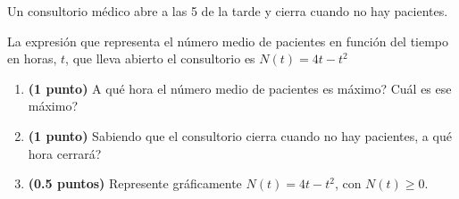
Un consultorio médico abre a las 5 de la tarde y cierra cuando no hay pacientes.

La expresión que representa el número medio de pacientes en función del tiempo en horas, $t$, que lleva abierto el consultorio es $N(t)=4t-t^2$
\begin{enumerate}[label=\alph*)]
\item \textbf{(1 punto)} \textquestiondown{}A qué hora el número medio de pacientes es máximo? \textquestiondown{}Cuál es ese máximo?
\item \textbf{(1 punto)} Sabiendo que el consultorio cierra cuando no hay pacientes, \textquestiondown{}a qué hora cerrará?
\item \textbf{(0.5 puntos)} Represente gráficamente $N(t)=4t-t^2$, con $N(t)\geq0$.
\end{enumerate}
